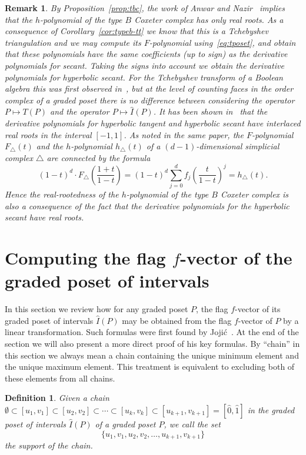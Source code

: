 \documentclass[reqno,12pt]{amsart}
\numberwithin{equation}{section}
\newtheorem{definition}[theorem]{Definition}
\newtheorem{remark}[theorem]{Remark}
\newcommand{\0}{\widehat{0}}
\newcommand{\1}{\widehat{1}}
\newcommand{\2}{\widehat{2}}
\newcommand{\grI}{\widehat{I}}
\begin{document}
\begin{remark}
{\em By Proposition~\ref{prop:tbc}, the work of Anwar and
  Nazir~\cite{Anwar} implies that the $h$-polynomial  of the type
  $B$ Coxeter complex has only real roots. As a consequence of
  Corollary~\ref{cor:typeb-tt} we know that this is a Tchebyshev
  triangulation and we may compute its $F$-polynomial
  using~\eqref{eq:tposet}, and obtain that these 
polynomials have the same coefficients (up to sign) as the derivative
polynomials for secant. Taking the signs into account we obtain the
derivative polynomials for hyperbolic secant. For the Tchebyshev
transform of a Boolean 
algebra this was first observed in~\cite[Corollary 9.3]{Hetyei-mfp}, but
at the level of counting faces in the order complex of a graded poset
there is no difference between considering the operator $P\mapsto T(P)$
and the operator $P\mapsto \grI(P)$. It has been shown
in~\cite{Hetyei-tt} that the derivative 
polynomials for hyperbolic tangent and hyperbolic secant have interlaced
real roots in the interval $[-1,1]$.  As noted in the same paper, the
$F$-polynomial $F_\triangle(t)$ and the $h$-polynomial
$h_{\triangle}(t)$ of a $(d-1)$-dimensional simplicial complex
$\triangle$  are connected by the formula 
$$
(1-t)^d\cdot F_{\triangle}\left(\frac{1+t}{1-t}\right)=(1-t)^d\sum_{j=0}^d f_j
\left(\frac{t}{1-t}\right)^j=h_{\triangle}(t).$$
Hence the real-rootedness of the $h$-polynomial
of the type $B$ Coxeter complex is also a consequence of the fact that
the derivative polynomials for the hyperbolic secant have real roots.
}
\end{remark}


\section{Computing the flag $f$-vector of the graded poset of intervals}
\label{sec:flagf}

In this section we review how for any graded poset $P$, the flag
$f$-vector of its graded poset of intervals $\grI(P)$ may be obtained
from the flag $f$-vector of $P$ by a linear transformation. Such
formulas were first found by Joji\'{c}~\cite{Jojic}. At the end of the
section we will also present a more direct proof of his key formulas. By
``chain'' in this section we always mean a chain containing the unique minimum
element and the unique maximum element. This treatment is equivalent to
excluding both of these elements from all chains. 

\begin{definition}
Given a chain $\emptyset\subset [u_1,v_1]\subset [u_2,v_2]\subset \cdots
\subset[u_k,v_k]\subset [u_{k+1},v_{k+1}]=[\0,\1]$ in the graded poset
of intervals $\grI(P)$ of a graded poset $P$, we call the set
$$\{u_1,v_1,u_2,v_2,\ldots,u_{k+1},v_{k+1}\}$$
the {\em support} of the chain.
\end{definition}  
\end{document}
